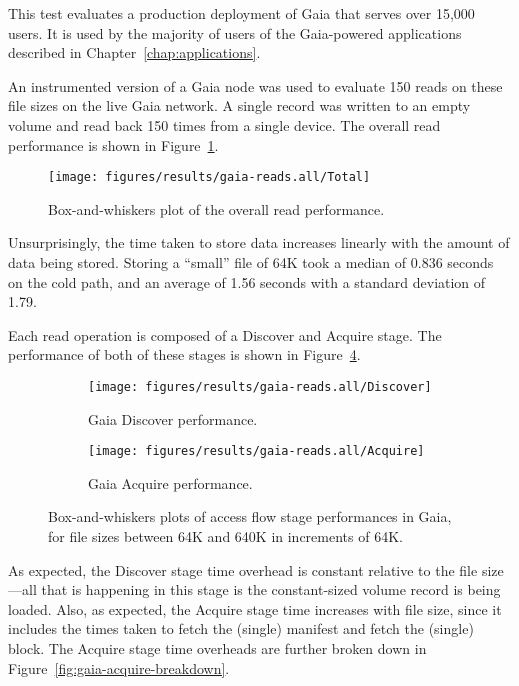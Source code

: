 This test evaluates a production deployment of Gaia that serves over
15,000 users.  It is used by the majority of users of the Gaia-powered
applications described in Chapter~\ref{chap:applications}.

An instrumented version of a Gaia node was used to evaluate 150 reads on these
file sizes on the live Gaia network.  A single record was written to an empty
volume and read back 150 times from a single device.
The overall read performance is shown in
Figure~\ref{fig:gaia-read-total}.

\begin{figure}[htp!]
   \centering
   \texttt{[image: figures/results/gaia-reads.all/Total]}
   \caption{Box-and-whiskers plot of the overall read performance.}
   \label{fig:gaia-read-total}
\end{figure}

Unsurprisingly, the time taken to store data increases linearly with the amount
of data being stored.  Storing a ``small'' file of 64K took a median of 0.836
seconds on the cold path, and an average of 1.56 seconds with a standard
deviation of 1.79.

Each read operation is composed of a Discover and Acquire stage.  The
performance of both of these stages is shown in
Figure~\ref{fig:gaia-read-stages}.

\begin{figure}[htp!]
   \centering
   \begin{subfigure}[b]{.8\textwidth}
      \texttt{[image: figures/results/gaia-reads.all/Discover]}
      \label{fig:gaia-read-discover}
      \caption{Gaia Discover performance.}
   \end{subfigure}
   \begin{subfigure}[b]{.8\textwidth}
      \texttt{[image: figures/results/gaia-reads.all/Acquire]}
      \label{fig:gaia-read-acquire}
      \caption{Gaia Acquire performance.}
   \end{subfigure}
   \caption{Box-and-whiskers plots of access flow stage performances in Gaia,
   for file sizes between 64K and 640K in increments of 64K.}
   \label{fig:gaia-read-stages}
\end{figure}

As expected, the Discover stage time overhead is constant relative to the file
size---all that is happening in this stage is the constant-sized 
volume record is being loaded.
Also, as expected, the Acquire stage time increases with file size, since
it includes the times taken to fetch the (single) manifest and fetch the (single) block.
The Acquire stage time overheads are further broken down in
Figure~\ref{fig:gaia-acquire-breakdown}.

